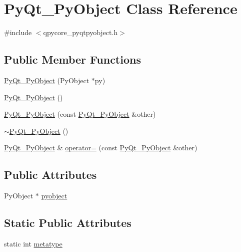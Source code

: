 \hypertarget{classPyQt__PyObject}{}\section{Py\+Qt\+\_\+\+Py\+Object Class Reference}
\label{classPyQt__PyObject}


{\ttfamily \#include $<$qpycore\+\_\+pyqtpyobject.\+h$>$}

\subsection*{Public Member Functions}
\begin{DoxyCompactItemize}
\item 
\hyperlink{classPyQt__PyObject_a8d50232cfe0c1412030359a2ecbf2f92}{Py\+Qt\+\_\+\+Py\+Object} (Py\+Object $\ast$py)
\item 
\hyperlink{classPyQt__PyObject_aa0e88b4957d5f97607e37945cff94595}{Py\+Qt\+\_\+\+Py\+Object} ()
\item 
\hyperlink{classPyQt__PyObject_a24d9ae01faf0be8fd14d77f5cc6014a3}{Py\+Qt\+\_\+\+Py\+Object} (const \hyperlink{classPyQt__PyObject}{Py\+Qt\+\_\+\+Py\+Object} \&other)
\item 
\hyperlink{classPyQt__PyObject_a1a1b235c27b9fe7f1aa4ab3ed09160c6}{$\sim$\+Py\+Qt\+\_\+\+Py\+Object} ()
\item 
\hyperlink{classPyQt__PyObject}{Py\+Qt\+\_\+\+Py\+Object} \& \hyperlink{classPyQt__PyObject_a56fbeacc35c757187ef8e1d9e3b5a443}{operator=} (const \hyperlink{classPyQt__PyObject}{Py\+Qt\+\_\+\+Py\+Object} \&other)
\end{DoxyCompactItemize}
\subsection*{Public Attributes}
\begin{DoxyCompactItemize}
\item 
Py\+Object $\ast$ \hyperlink{classPyQt__PyObject_a802dfa45be9c67a89b2045179a2e571c}{pyobject}
\end{DoxyCompactItemize}
\subsection*{Static Public Attributes}
\begin{DoxyCompactItemize}
\item 
static int \hyperlink{classPyQt__PyObject_a37e940ec55d2af65c27d4848df5e34ca}{metatype}
\end{DoxyCompactItemize}



